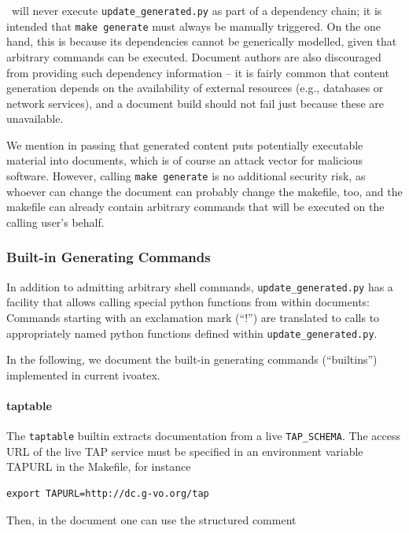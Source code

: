 \documentclass[11pt,a4paper]{ivoa}
\begin{document}
\ivoatex~will never execute \texttt{update\_generated.py} as part of a
dependency chain; it is intended that \texttt{make generate} must always
be manually triggered.  On the one hand, this is because its
dependencies cannot be generically modelled, given that arbitrary
commands can be executed.  Document authors are also discouraged from
providing such dependency information -- it is fairly common that
content generation depends on the availability of external resources
(e.g., databases or network services), and a document build should not
fail just because these are unavailable.

We mention in passing that generated content puts potentially executable
material into documents, which is of course an attack vector for
malicious software.  However, calling \texttt{make generate} is no
additional security risk, as whoever can change the document can
probably change the makefile, too, and the makefile can already contain
arbitrary commands that will be executed on the calling user's behalf.


\subsubsection{Built-in Generating Commands}

In addition to admitting arbitrary shell
commands, \texttt{update\_generated.py} has a facility that allows
calling special python functions from within documents: Commands
starting with an exclamation mark (``!'') are translated to calls to
appropriately named python functions defined within
\texttt{update\_generated.py}.

In the following, we document the built-in generating commands
(``builtins'') implemented in current ivoatex.

\paragraph{taptable}

The \texttt{taptable} builtin extracts documentation from a
live \texttt{TAP\_SCHEMA}.  The access URL of the
live TAP service must be specified in an environment variable TAPURL in
the Makefile, for instance

\begin{lstlisting}
export TAPURL=http://dc.g-vo.org/tap
\end{lstlisting}

Then, in the document one can use the structured comment
\end{document}
